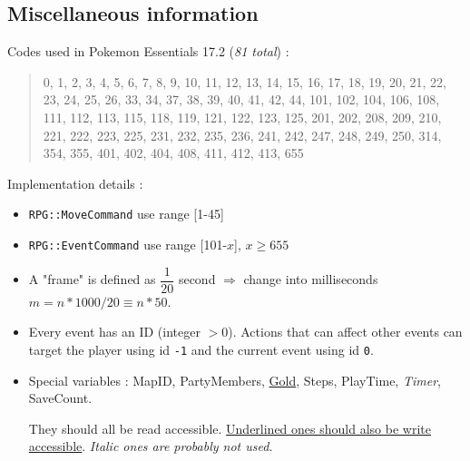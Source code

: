 \documentclass[11pt]{article}
\begin{document}


\subsection{Miscellaneous information}

Codes used in Pokemon Essentials 17.2 (\textit{81 total}) :
\begin{quote}
	0, 1, 2, 3, 4, 5, 6, 7, 8, 9, 10, 11, 12, 13, 14, 15, 16, 17, 18, 19, 20, 21, 22, 23, 24, 25, 26, 33, 34, 37, 38, 39, 40, 41, 42, 44, 101, 102, 104, 106, 108, 111, 112, 113, 115, 118, 119, 121, 122, 123, 125, 201, 202, 208, 209, 210, 221, 222, 223, 225, 231, 232, 235, 236, 241, 242, 247, 248, 249, 250, 314, 354, 355, 401, 402, 404, 408, 411, 412, 413, 655
\end{quote}

Implementation details :
\begin{itemize}
	\item \verb|RPG::MoveCommand| use range [1-45]
	
	\item \verb|RPG::EventCommand| use range [101-$x$], $x\geq 655$
	
	\item A "frame" is defined as $\dfrac{1}{20}$ second $\Rightarrow$ change into milliseconds $m=n*1000/20\equiv n*50$.
	
	\item Every event has an ID (integer $>0$). Actions that can affect other events can target the player using id \verb|-1| and the current event using id \verb|0|.
	
	\item Special variables : MapID, PartyMembers, \underline{Gold}, Steps, PlayTime, \textit{Timer}, SaveCount.
	
	They should all be read accessible. \underline{Underlined ones should also be write accessible}. \textit{Italic ones are probably not used}.
\end{itemize}
\end{document}
